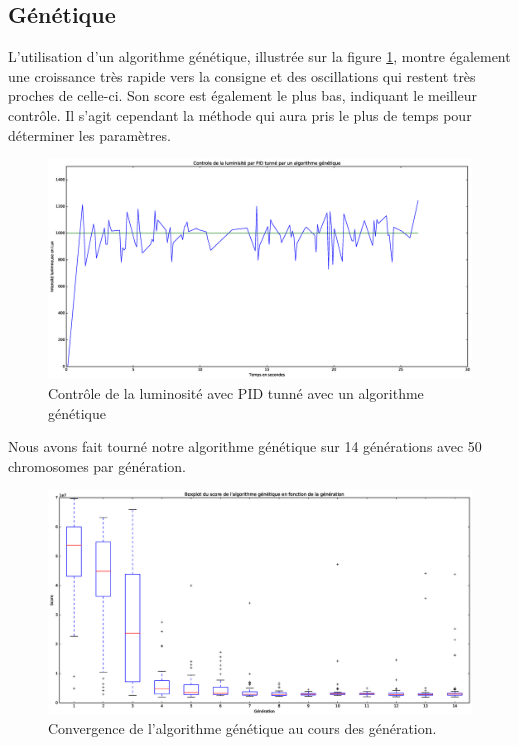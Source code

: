 \documentclass[a4paper,10pt]{report}
\begin{document}
\subsection{Génétique}
L'utilisation d'un algorithme génétique, illustrée sur la figure \ref{fig:genetique}, montre également une croissance très rapide vers la consigne et des oscillations qui restent très proches de celle-ci.
Son score est également le plus bas, indiquant le meilleur contrôle.
Il s'agit cependant la méthode qui aura pris le plus de temps pour déterminer les paramètres.
\begin{figure}[hb!]
   \centering
   \includegraphics[scale=0.35]{Genetic.eps}
   \caption{\label{fig:genetique} Contrôle de la luminosité avec PID tunné avec un algorithme génétique}
\end{figure}

Nous avons fait tourné notre algorithme génétique sur 14 générations avec 50 chromosomes par génération.
\begin{figure}[hb!]
   \centering
   \includegraphics[scale=0.35]{GeneticBoxplot.eps}
    \caption{\label{fig:convergence} Convergence de l'algorithme génétique au cours des génération.}
\end{figure}
\end{document}
